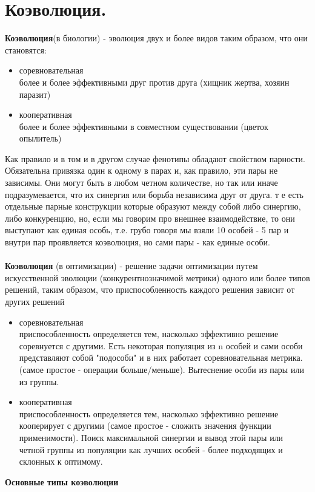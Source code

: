 \section{Коэволюция.}
\textbf{Коэволюция}(в биологии) - эволюция двух и более видов таким образом, что они становятся:
\begin{itemize}
    \item соревновательная\\
    более и более эффективными друг против друга (хищник жертва, хозяин паразит)
    \item кооперативная\\
    более и более эффективными в совместном существовании (цветок опылитель)
\end{itemize}
Как правило и в том и в другом случае фенотипы обладают свойством парности. Обязательна привязка один к одному в парах и, как правило, эти пары не зависимы. Они могут быть в любом четном количестве, но так или иначе подразумевается, что их синергия или борьба независима друг от друга. т е есть отдельные парные конструкции которые образуют между собой либо синергию, либо конкуренцию, но, если мы говорим про внешнее взаимодействие, то они выступают как единая особь, т.е. грубо говоря мы взяли 10 особей - 5 пар и внутри пар проявляется коэволюция, но сами пары - как единые особи. \\
\\
\textbf{Коэволюция} (в оптимизации) - решение задачи оптимизации путем искусственной эволюции (конкурентнозначимой метрики) одного или более типов решений, таким образом, что приспособленность каждого решения зависит от других решений
\begin{itemize}
    \item соревновательная\\
    приспособленность определяется тем, насколько эффективно решение соревнуется с другими. Есть некоторая популяция из n особей и сами особи представляют собой "подособи" и в них работает соревновательная метрика. (самое простое - операции больше/меньше). Вытеснение особи из пары или из группы.
    \item кооперативная\\
    приспособленность определяется тем, насколько эффективно решение кооперирует с другими (самое простое - сложить значения функции применимости). Поиск максимальной синергии и вывод этой пары или четной группы из популяции как лучших особей - более подходящих и склонных к оптимому. 
\end{itemize}
\textbf{Основные типы коэволюции} \\
